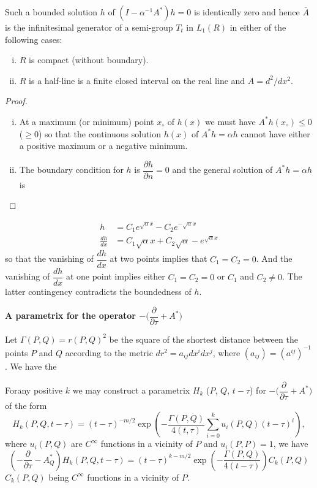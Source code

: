 Such a bounded solution $h$ of $(I- \alpha^{-1} A^*)h=0$ is
identically zero and hence $\bar {A}$ is the infinitesimal generator
of a semi-group $T_t$ in $L_1(R)$ in either of the following cases: 
\begin{enumerate}[(i)]
\item $R$ is compact (without boundary).
\item $R$ is a half-line is a finite closed interval on the real line
 and $A=d^2/dx^2$. 
\end{enumerate}

\begin{proof}
 \begin{enumerate}[(i)]
 \item At a maximum (or minimum) point $x_ \circ$ of $h(x)$ we must
  have $A^*h(x_ \circ) \leq 0$ (\resp $\geq 0$) so that the
  continuous solution $h(x)$ of $A^*h= \alpha h$ cannot have either
  a positive maximum or a negative minimum. 
 \item The boundary condition for $h$ is $\dfrac{\partial h}{\partial
  n}=0$ and the general solution of $A^*h =\alpha h$ is 
 \end{enumerate}
\end{proof}

\begin{align*}
 h &=C_1 e^{\sqrt{\alpha} x}- C_2 e^{-\sqrt{\alpha} x}\\
 \frac{dh}{dx} &= C_1 \sqrt{\alpha} x + C_2
 \sqrt{\alpha}-e^{\sqrt{\alpha} x}
\end{align*}
so that the vanishing of $\dfrac{dh}{dx}$ at two points implies that
$C_1=C_2=0$. And the vanishing of $\dfrac{dh}{dx}$ at one point
implies either $C_1=C_2=0$ or $C_1$ and $C_2 \neq 0$. The latter
contingency contradicts the boundedness of $h$. 

\noindent \textbf{A parametrix for the operator $-\bigg (
 \dfrac{\partial}{\partial \tau}+ A^* \bigg )$} 

Let $\Gamma (P,Q)=r (P,Q)^2$ be the square of the shortest distance
between the points $P$ and $Q$ according to the metric $dr^2=a_{ij}dx^i
dx^j$, where $(a_{ij})=(a^{ij})^{-1}$. We have the 

\begin{theorem*}%
 For\pageoriginale any positive $k$ we may construct a parametrix $H_k$ ($P$, $Q$, $t-\tau$)
 for $-\bigg ( \dfrac{\partial}{\partial \tau}+ A^* \bigg )$ of the
 form 
 $$
 H_k (P,Q,t-\tau)= (t- \tau)^{-m/2} \exp \left(-\frac{\Gamma
  (P,Q)}{4(t,\tau)} \sum^k_{i=0} u_i (P,Q)(t - \tau)^i\right), 
 $$
 where $u_i(P,Q)$ are $C^ \infty$ functions in a vicinity of $P$ and
 $u_i(P,P)=1$, we have 
 $$
 \left( -\frac{\partial}{\partial \tau}- A^*_Q \right )H_k
 (P,Q,t-\tau)=(t-\tau)^{k-m/2} \exp \left(-\frac{\Gamma
  (P,Q)}{4(t-\tau)}\right)C_k (P,Q) 
 $$
 $C_k(P,Q)$ being $C^ \infty$ functions in a vicinity of $P$.
\end{theorem*}

